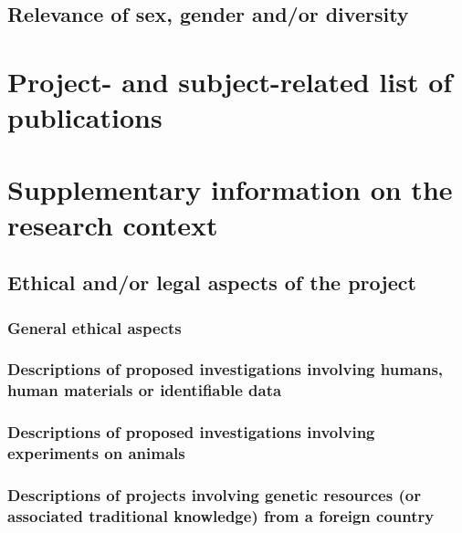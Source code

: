 \documentclass{scrartcl}
\begin{document}
\subsection{Relevance of sex, gender and/or diversity}

\section{Project- and subject-related list of publications}
\label{sec:bib}


\backmatter
\section{Supplementary information on the research context}

\subsection{Ethical and/or legal aspects of the project}

\subsubsection{General ethical aspects}

\subsubsection{Descriptions of proposed investigations involving humans, human materials or identifiable data}

\subsubsection{Descriptions of proposed investigations involving experiments on animals}

\subsubsection{Descriptions of projects involving genetic resources (or associated traditional knowledge) from a foreign country}
\end{document}
